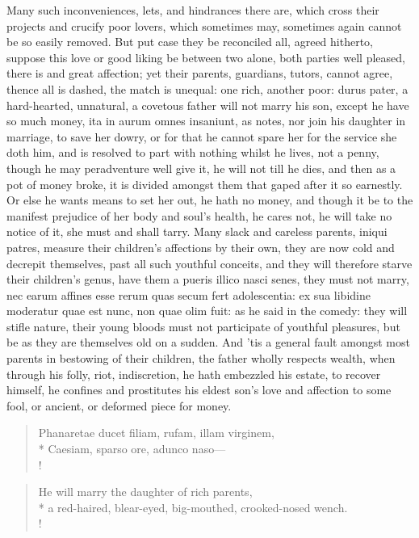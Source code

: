 Many such inconveniences, lets, and hindrances there are, which cross
their projects and crucify poor lovers, which sometimes may, sometimes
again cannot be so easily removed. But put case they be reconciled all,
agreed hitherto, suppose this love or good liking be between two alone,
both parties well pleased, there is  and great
affection; yet their parents, guardians, tutors, cannot agree, thence
all is dashed, the match is unequal: one rich, another poor: durus
pater, a hard-hearted, unnatural, a covetous father will not marry his
son, except he have so much money, ita in aurum omnes insaniunt, as
\Chrysostom{} notes, nor join his daughter in marriage, to save her
dowry, or for that he cannot spare her for the service she doth him,
and is resolved to part with nothing whilst he lives, not a penny,
though he may peradventure well give it, he will not till he dies, and
then as a pot of money broke, it is divided amongst them that gaped
after it so earnestly. Or else he wants means to set her out, he hath
no money, and though it be to the manifest prejudice of her body and
soul's health, he cares not, he will take no notice of it, she must and
shall tarry. Many slack and careless parents, iniqui patres, measure
their children's affections by their own, they are now cold and
decrepit themselves, past all such youthful conceits, and they will
therefore starve their children's genus, have them a pueris 
illico nasci senes, they must not marry, nec earum affines esse rerum
quas secum fert adolescentia: ex sua libidine moderatur quae est nunc,
non quae olim fuit: as he said in the comedy: they will stifle nature,
their young bloods must not participate of youthful pleasures, but be
as they are themselves old on a sudden. And 'tis a general fault
amongst most parents in bestowing of their children, the father wholly
respects wealth, when through his folly, riot, indiscretion, he hath
embezzled his estate, to recover himself, he confines and prostitutes
his eldest son's love and affection to some fool, or ancient, or
deformed piece for money.
%
\begin{latin}%
\begin{verse}%
Phanaretae ducet filiam, rufam, illam virginem,\\*
Caesiam, sparso ore, adunco naso---\\!
\end{verse}%
\end{latin}%
\translationrule%
\begin{verse}%
He will marry the daughter of rich parents,\\*
a red-haired, blear-eyed, big-mouthed, crooked-nosed wench.\\!
\end{verse}%
%

